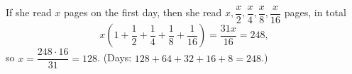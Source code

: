 If she read $x$ pages on the first day, then she read $x,\dfrac {x}{2},\dfrac {x}{4},\dfrac {x}{8},\dfrac {x}{16}$ pages, in total
\[
x\left(1+\dfrac{1}{2}+\dfrac{1}{4}+\dfrac{1}{8}+\dfrac{1}{16}\right)=\dfrac{31x}{16}=248,
\]
so $x=\dfrac{248\cdot16}{31}=\boxed{128}$. (Days: $128+64+32+16+8=248$.)
